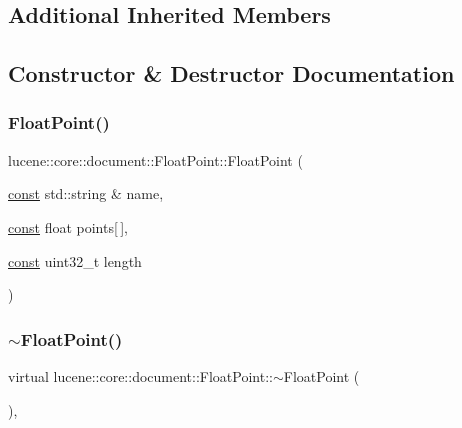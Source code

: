 \subsection*{Additional Inherited Members}


\subsection{Constructor \& Destructor Documentation}
\mbox{\label{classlucene_1_1core_1_1document_1_1FloatPoint_a5ea967634ff73cdde9915e722bc823fc}} 
\subsubsection{\texorpdfstring{Float\+Point()}{FloatPoint()}}
{\footnotesize\ttfamily lucene\+::core\+::document\+::\+Float\+Point\+::\+Float\+Point (\begin{DoxyParamCaption}\item[{\mbox{\hyperlink{ZlibCrc32_8h_a2c212835823e3c54a8ab6d95c652660e}{const}} std\+::string \&}]{name,  }\item[{\mbox{\hyperlink{ZlibCrc32_8h_a2c212835823e3c54a8ab6d95c652660e}{const}} float}]{points\mbox{[}$\,$\mbox{]},  }\item[{\mbox{\hyperlink{ZlibCrc32_8h_a2c212835823e3c54a8ab6d95c652660e}{const}} uint32\+\_\+t}]{length }\end{DoxyParamCaption})\hspace{0.3cm}{\ttfamily [inline]}}

\mbox{\label{classlucene_1_1core_1_1document_1_1FloatPoint_af7445c4ea46294911dce52ae13d4b62a}} 
\subsubsection{\texorpdfstring{$\sim$\+Float\+Point()}{~FloatPoint()}}
{\footnotesize\ttfamily virtual lucene\+::core\+::document\+::\+Float\+Point\+::$\sim$\+Float\+Point (\begin{DoxyParamCaption}{ }\end{DoxyParamCaption})\hspace{0.3cm}{\ttfamily [inline]}, {\ttfamily [virtual]}}



